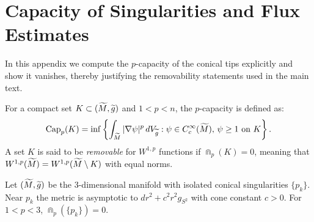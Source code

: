\section{Capacity of Singularities and Flux Estimates}
\label{app:Capacity}
\label{sec:Capacity}

In this appendix we compute the $p$-capacity of the conical tips explicitly and show it vanishes, thereby justifying the removability statements used in the main text.

\begin{definition}[$p$-Capacity]
For a compact set $K \subset (\widetilde{M}, \widetilde{g})$ and $1 < p < n$, the $p$-capacity is defined as:
\[
    \text{Cap}_p(K) = \inf \left\{ \int_{\widetilde{M}} |\nabla \psi|^p \, dV_{\widetilde{g}} : \psi \in C^\infty_c(\widetilde{M}), \, \psi \ge 1 \text{ on } K \right\}.
\]
A set $K$ is said to be \emph{removable} for $W^{1,p}$ functions if $\Cap_p(K) = 0$, meaning that $W^{1,p}(\widetilde{M}) = W^{1,p}(\widetilde{M} \setminus K)$ with equal norms.
\end{definition}

\begin{theorem}\label{thm:CapacityZero}
Let $(\widetilde{M}, \widetilde{g})$ be the 3-dimensional manifold with isolated conical singularities $\{p_k\}$. Near $p_k$ the metric is asymptotic to $dr^2 + c^2 r^2 g_{S^2}$ with cone constant $c > 0$. For $1<p<3$, $\Cap_p(\{p_k\})=0$.
\end{theorem}

